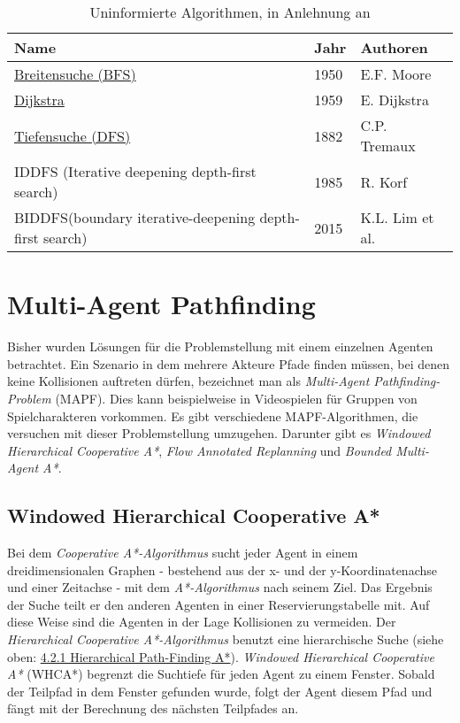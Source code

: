 \begin{table}[h]
	\begin{tabular}[h]{L{8cm}|C{1cm}|L{5cm}}
		\hline
		\textbf{Name}                                                    & \textbf{Jahr} & \textbf{Authoren}        \\ \hline
		\hyperref[sec:bfs]{Breitensuche (BFS)}                                      & 1950 & E.F. Moore      \\ \hline
		\hyperref[sec:dijkstra]{Dijkstra}                                                & 1959 & E. Dijkstra     \\ \hline
		\hyperref[sec:dfs]{Tiefensuche (DFS)}                                       & 1882 & C.P. Tremaux    \\ \hline
		IDDFS (Iterative deepening depth-first search)          & 1985 & R. Korf         \\ \hline
		BIDDFS(boundary iterative-deepening depth-first search) & 2015 & K.L. Lim et al. \\ \hline
	\end{tabular}
	\caption{\label{tab:uninformed}Uninformierte Algorithmen, in Anlehnung an \cite[S.233]{Noo15}}
\end{table}



\section{Multi-Agent Pathfinding}
Bisher wurden Lösungen für die Problemstellung mit einem einzelnen Agenten betrachtet. Ein Szenario in dem mehrere Akteure Pfade finden müssen, bei denen keine Kollisionen auftreten dürfen, bezeichnet man als \textit{Multi-Agent Pathfinding-Problem} (MAPF). Dies kann beispielweise in Videospielen für Gruppen von Spielcharakteren vorkommen. Es gibt verschiedene MAPF-Algorithmen, die versuchen mit dieser Problemstellung umzugehen. Darunter gibt es \textit{Windowed Hierarchical Cooperative A*}, \textit{Flow Annotated Replanning} und \textit{Bounded Multi-Agent A*}.

\subsection{Windowed Hierarchical Cooperative A*}
Bei dem \textit{Cooperative A*-Algorithmus} sucht jeder Agent in einem dreidimensionalen Graphen - bestehend aus der x- und der y-Koordinatenachse und einer Zeitachse - mit dem \textit{A*-Algorithmus} nach seinem Ziel. 
Das Ergebnis der Suche teilt er den anderen Agenten in einer Reservierungstabelle mit. Auf diese Weise sind die Agenten in der Lage Kollisionen zu vermeiden. 
Der \textit{Hierarchical Cooperative A*-Algorithmus} benutzt eine hierarchische Suche (siehe oben: \hyperref[sec:hpa]{4.2.1 Hierarchical Path-Finding A*}). \textit{Windowed Hierarchical Cooperative A*} (WHCA*) begrenzt die Suchtiefe für jeden Agent zu einem Fenster. Sobald der Teilpfad in dem Fenster gefunden wurde, folgt der Agent diesem Pfad und fängt mit der Berechnung des nächsten Teilpfades an.

